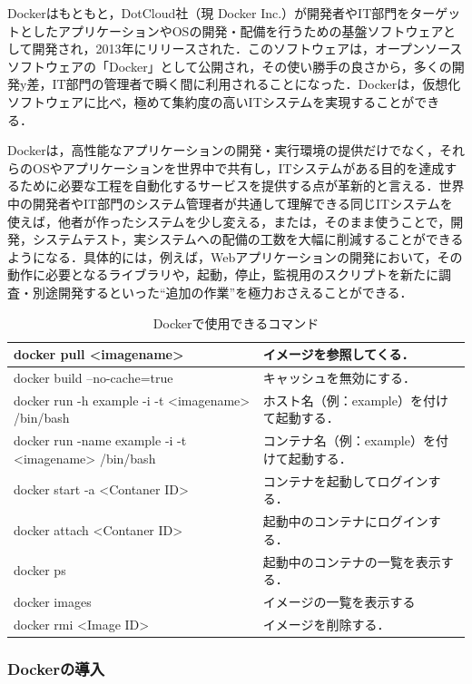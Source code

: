Docker\cite{docker}はもともと，DotCloud社（現 Docker Inc.）が開発者やIT部門をターゲットとしたアプリケーションやOSの開発・配備を行うための基盤ソフトウェアとして開発され，2013年にリリースされた．このソフトウェアは，オープンソースソフトウェアの「Docker」として公開され，その使い勝手の良さから，多くの開発y差，IT部門の管理者で瞬く間に利用されることになった．Dockerは，仮想化ソフトウェアに比べ，極めて集約度の高いITシステムを実現することができる．

Dockerは，高性能なアプリケーションの開発・実行環境の提供だけでなく，それらのOSやアプリケーションを世界中で共有し，ITシステムがある目的を達成するために必要な工程を自動化するサービスを提供する点が革新的と言える．世界中の開発者やIT部門のシステム管理者が共通して理解できる同じITシステムを使えば，他者が作ったシステムを少し変える，または，そのまま使うことで，開発，システムテスト，実システムへの配備の工数を大幅に削減することができるようになる．具体的には，例えば，Webアプリケーションの開発において，その動作に必要となるライブラリや，起動，停止，監視用のスクリプトを新たに調査・別途開発するといった“追加の作業”を極力おさえることができる．

\begin{table}[htb]
\caption{Dockerで使用できるコマンド}
\label{table:Vagrant}
\begin{tabular}{|p{5cm}|p{7.5cm}|} \hline
docker pull <imagename> & イメージを参照してくる．\\ \hline
docker build --no-cache=true & キャッシュを無効にする．\\ \hline
docker run -h example -i -t <imagename> /bin/bash & ホスト名（例：example）を付けて起動する．\\ \hline
docker run -name example -i -t <imagename> /bin/bash & コンテナ名（例：example）を付けて起動する．\\ \hline
docker start -a <Contaner ID> & コンテナを起動してログインする．\\ \hline
docker attach <Contaner ID> & 起動中のコンテナにログインする．\\ \hline
docker ps & 起動中のコンテナの一覧を表示する．\\ \hline
docker images & イメージの一覧を表示する\\ \hline
docker rmi <Image ID> & イメージを削除する．\\ \hline
\end{tabular}
\end{table}

\newpage

\subsubsection{Dockerの導入}

